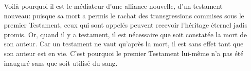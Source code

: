 Voilà pourquoi il est le médiateur d’une alliance nouvelle,
		d’un testament nouveau:
	puisque sa mort a permis le rachat
		des transgressions commises sous le premier Testament,
	ceux qui sont appelés peuvent recevoir l’héritage éternel jadis promis.
Or, quand il y a testament,
	il est nécessaire que soit constatée la mort de son auteur.
Car un testament ne vaut qu’après la mort,
	il est sans effet tant que son auteur est en vie.
C’est pourquoi le premier Testament lui-même n’a pas été inauguré
	sans que soit utilisé du sang.
